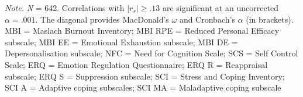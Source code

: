 \documentclass[
  man]{apa6}
\newenvironment{lltable}{\begin{landscape}\centering\begin{ThreePartTable}}{\end{ThreePartTable}\end{landscape}}
\begin{document}
\begin{lltable}

\begin{TableNotes}[para]
\normalsize{\textit{Note.} \textit{N} = 642. Correlations with $|r_s|\geq.13$ are significant at an uncorrected $\alpha = .001$. The diagonal provides MacDonald’s $\omega$ and Cronbach’s $\alpha$ (in brackets). MBI = Maslach Burnout Inventory; MBI RPE = Reduced Personal Efficacy subscale; MBI EE = Emotional Exhaustion subscale; MBI DE = Depersonalisation subscale; NFC = Need for Cognition Scale; SCS = Self Control Scale; ERQ = Emotion Regulation Questionnaire; ERQ R = Reappraisal subscale; ERQ S = Suppression subscale; SCI = Stress and Coping Inventory; SCI A = Adaptive coping subscales; SCI MA = Maladaptive coping subscale}
\end{TableNotes}

\scriptsize{

}
\end{lltable}
\end{document}
